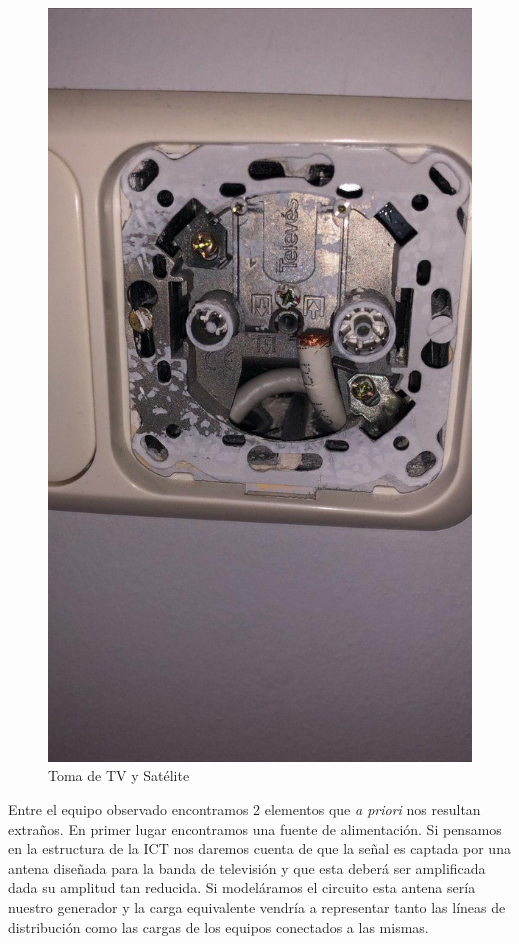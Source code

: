 \documentclass{article}[12 pt]
\begin{document}
		\begin{figure}
				\centering
				\includegraphics[scale=0.2]{enchufe_tv.jpg}
				\caption{Toma de TV y Satélite}
				\label{f:toma}
		\end{figure}

		Entre el equipo observado encontramos 2 elementos que \textit{a priori} nos resultan extraños. En primer lugar encontramos una fuente de alimentación. Si pensamos en la estructura de la ICT nos daremos cuenta de que la señal es captada por una antena diseñada para la banda de televisión y que esta deberá ser amplificada dada su amplitud tan reducida. Si modeláramos el circuito esta antena sería nuestro generador y la carga equivalente vendría a representar tanto las líneas de distribución como las cargas de los equipos conectados a las mismas.\\
\end{document}

